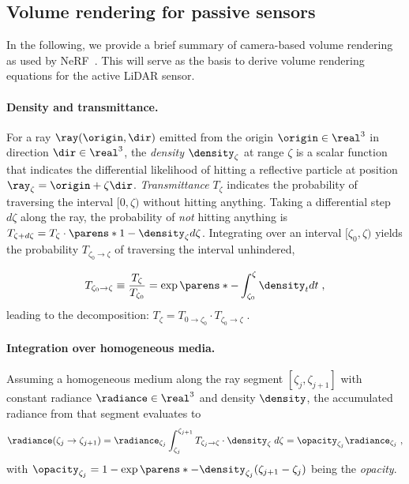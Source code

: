 \subsection{Volume rendering for passive sensors}
\label{sec:revisit_vr}
In the following, we provide a brief summary of camera-based volume rendering as used by NeRF~\cite{mildenhall2020nerf,tagliasacchi2022volume}. This will serve as the basis to derive volume rendering equations for the active LiDAR sensor.

\paragraph{Density and transmittance.}
For a ray $\ray(\origin, \dir)$ emitted from the origin $\origin \in \real^3$ in direction $\dir \in \real^3$, the \textit{density} $\density_\zeta$ at range $\zeta$ is a scalar function that indicates the differential likelihood of hitting a reflective particle at position $\ray_\zeta = \origin + \zeta \dir$. \textit{Transmittance} $T_{\zeta}$ indicates the probability of traversing the interval $[0, \zeta)$ without hitting anything. Taking a differential step $d\zeta$ along the ray,  the probability of \emph{not} hitting anything is $T_{\zeta+d\zeta} = T_{\zeta} \cdot \parens*{1 -\density_\zeta d\zeta}$.
Integrating over an interval $[\zeta_0, \zeta)$ yields the probability $T_{\zeta_0 \rightarrow \zeta}$ of traversing the interval unhindered,

\begin{equation}
T_{\zeta_0 \rightarrow \zeta} \equiv \frac{T_{\zeta}}{T_{\zeta_0}} = \exp\parens*{-\int_{\zeta_0}^\zeta \density_t dt}\;,
\label{eq:trans_ab}
\end{equation}
leading to the decomposition: $T_{\zeta} = T_{0 \rightarrow \zeta_0} \cdot T_{\zeta_0 \rightarrow \zeta}\;.$
    


\paragraph{Integration over homogeneous media.}
Assuming a homogeneous medium along the ray segment $[\zeta_j, \zeta_{j+1}]$ with constant radiance $\radiance \in \real^3$ and density $\density$, the accumulated radiance from that segment evaluates to 
\begin{equation}
    \radiance(\zeta_j \rightarrow \zeta_{j+1}) 
    = \radiance_{\zeta_j}\int_{\zeta_j}^{\zeta_{j+1}} T_{\zeta_j \rightarrow \zeta} \cdot \density_\zeta \; d\zeta
    = \opacity_{\zeta_j} \radiance_{\zeta_j}\;,
\end{equation}
with $\opacity_{\zeta_j}=1-\exp\parens*{{-\density_{\zeta_j}(\zeta_{j+1} - \zeta_j)}}$ being the \textit{opacity}. 

